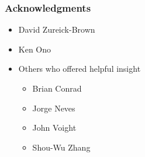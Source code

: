 \documentclass{beamer}
\theoremstyle{remark}
\begin{document}

\begin{frame}
\frametitle{Acknowledgments}
\begin{itemize}
	\item David Zureick-Brown
	\item Ken Ono
	\item Others who offered helpful insight
	\begin{itemize}
		\item Brian Conrad
		\item Jorge Neves
		\item John Voight
		\item Shou-Wu Zhang
	\end{itemize}
\end{itemize}
\end{frame}
\end{document}
